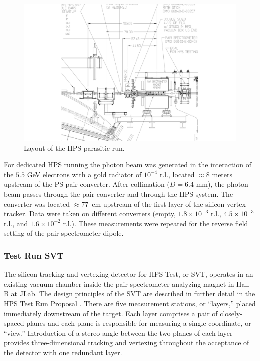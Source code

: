\begin{figure}[ht]
    \includegraphics[width=\textwidth]{test2012/HPS_dimensions}
\caption{\small{Layout of the HPS parasitic run.} }
\label{fig:hpstest_layout}
\end{figure}

For dedicated HPS running the photon beam was generated in the interaction of the $5.5$ GeV electrons with a gold radiator of $10^{-4}$ r.l., located $\approx 8$ meters upstream of the PS pair converter. After collimation ($D=6.4$ mm), the photon beam passes through the pair converter and through the HPS system. The converter was located $\approx 77$~cm upstream of the first layer of the silicon vertex tracker. Data were taken on different converters (empty, $1.8\times 10^{-3}$ r.l., $4.5\times 10^{-3}$ r.l., and $1.6\times 10^{-2}$ r.l.). These measurements were repeated for the reverse field setting of the pair spectrometer dipole.

\subsubsection{Test Run SVT}
\label{sec:svt_testrun}
The silicon tracking and vertexing detector for HPS Test, or SVT, operates in an existing vacuum chamber inside the pair spectrometer analyzing magnet in Hall B at JLab.  The design principles of the SVT are described in further detail in the HPS Test Run Proposal  \cite{HPS_tPROP}. There are five measurement stations, or ``layers,'' placed immediately downstream of the target. Each layer comprises a pair of closely-spaced planes and each plane is responsible for measuring a single coordinate, or ``view.'' Introduction of a stereo angle between the two planes of each layer provides three-dimensional tracking and vertexing throughout the acceptance of the detector with one redundant layer. 

